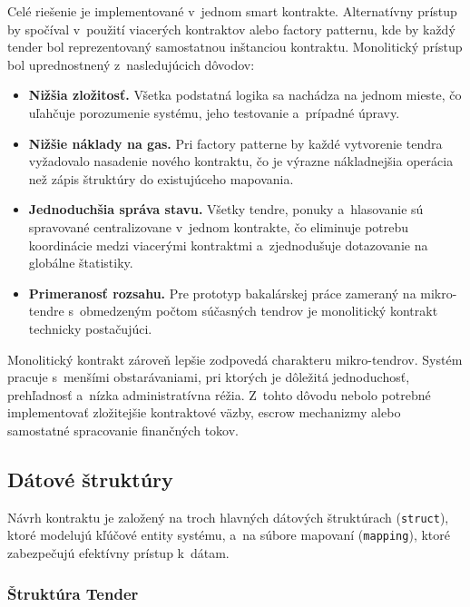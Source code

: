 Celé riešenie je implementované v~jednom smart kontrakte. Alternatívny prístup
by spočíval v~použití viacerých kontraktov alebo factory patternu, kde by každý
tender bol reprezentovaný samostatnou inštanciou kontraktu. Monolitický prístup
bol uprednostnený z~nasledujúcich dôvodov:

\begin{itemize}
    \item \textbf{Nižšia zložitosť.} Všetka podstatná logika sa nachádza na
    jednom mieste, čo uľahčuje porozumenie systému, jeho testovanie
    a~prípadné úpravy.

    \item \textbf{Nižšie náklady na gas.} Pri factory patterne by každé
    vytvorenie tendra vyžadovalo nasadenie nového kontraktu, čo je
    výrazne nákladnejšia operácia než zápis štruktúry do existujúceho
    mapovania.

    \item \textbf{Jednoduchšia správa stavu.} Všetky tendre, ponuky
    a~hlasovanie sú spravované centralizovane v~jednom kontrakte, čo
    eliminuje potrebu koordinácie medzi viacerými kontraktmi a~zjednodušuje
    dotazovanie na globálne štatistiky.

    \item \textbf{Primeranosť rozsahu.} Pre prototyp bakalárskej práce
    zameraný na mikro-tendre s~obmedzeným počtom súčasných tendrov je
    monolitický kontrakt technicky postačujúci.
\end{itemize}

Monolitický kontrakt zároveň lepšie zodpovedá charakteru mikro-tendrov.
Systém pracuje s~menšími obstarávaniami, pri ktorých je dôležitá jednoduchosť,
prehľadnosť a~nízka administratívna réžia. Z~tohto dôvodu nebolo potrebné
implementovať zložitejšie kontraktové väzby, escrow mechanizmy alebo
samostatné spracovanie finančných tokov.

\subsection{Dátové štruktúry}
\label{subsec:data_structures}

Návrh kontraktu je založený na troch hlavných dátových štruktúrach
(\texttt{struct}), ktoré modelujú kľúčové entity systému, a~na súbore
mapovaní (\texttt{mapping}), ktoré zabezpečujú efektívny prístup k~dátam.

\subsubsection{Štruktúra Tender}

